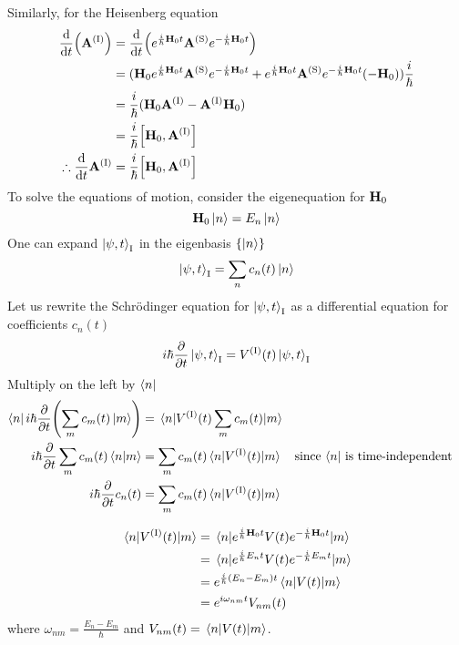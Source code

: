 \documentclass[12pt,a4paper,titlepage]{article}
\newcommand{\trm}[1]{\textrm{#1}} %
\begin{document}
Similarly, for the Heisenberg equation
\begin{equation}
\begin{aligned}
\dv{t}(\vb{A}^{(\trm{I})})&=\dv{t}\qty(e^{\frac{i}{\hbar}\vb{H}_{0}t}\vb{A}^{(\trm{S})}e^{-\frac{i}{\hbar}\vb{H}_{0}t})\\
&=(\vb{H}_{0}e^{\frac{i}{\hbar}\vb{H}_{0}t}\vb{A}^{(\trm{S})}e^{-\frac{i}{\hbar}\vb{H}_{0}t}+e^{\frac{i}{\hbar}\vb{H}_{0}t}\vb{A}^{(\trm{S})}e^{-\frac{i}{\hbar}\vb{H}_{0}t}(-\vb{H}_{0}))\frac{i}{\hbar}\\
&=\frac{i}{\hbar}(\vb{H}_{0}\vb{A}^{(\trm{I})}-\vb{A}^{(\trm{I})}\vb{H}_{0})\\
&=\frac{i}{\hbar}\comm{\vb{H}_{0}}{\vb{A}^{(\trm{I})}}\\
\therefore\dv{t}\vb{A}^{(\trm{I})}&=\frac{i}{\hbar}\comm{\vb{H}_{0}}{\vb{A}^{(\trm{I})}}
\end{aligned}
\end{equation}
To solve the equations of motion, consider the eigenequation for $\vb{H}_{0}$
\begin{equation}
\vb{H}_{0}\ket{n}=E_{n}\ket{n}
\end{equation}
One can expand $\ket{\psi,t}_{\trm{I}}$ in the eigenbasis $\{\ket{n}\}$
\begin{equation}
\ket{\psi,t}_{\trm{I}}=\sum_{n}c_{n}(t)\ket{n}
\end{equation}
Let us rewrite the Schr\"{o}dinger equation for $\ket{\psi,t}_{\trm{I}}$ as a differential equation for coefficients $c_{n}(t)$
\begin{equation}
i\hbar\pdv{t}\ket{\psi,t}_{\trm{I}}=V^{(\trm{I})}(t)\ket{\psi,t}_{\trm{I}}
\end{equation}
Multiply on the left by $\bra{n}$
\begin{equation}
\begin{aligned}
\bra{n}i\hbar\pdv{t}\qty(\sum_{m}c_{m}(t)\ket{m})&=\mel{n}{V^{(\trm{I})}(t)\sum_{m}c_{m}(t)}{m}\\
i\hbar\pdv{t}\sum_{m}c_{m}(t)\ip{n}{m}&=\sum_{m}c_{m}(t)\mel{n}{V^{(\trm{I})}(t)}{m}\qq{since $\bra{n}$ is time-independent}\\
i\hbar\pdv{t}c_{n}(t)&=\sum_{m}c_{m}(t)\mel{n}{V^{(\trm{I})}(t)}{m}
\end{aligned}
\end{equation}

\begin{equation}
\begin{aligned}
\mel{n}{V^{(\trm{I})}(t)}{m}&=\mel{n}{e^{\frac{i}{\hbar}\vb{H}_{0}t}V(t)e^{-\frac{i}{\hbar}\vb{H}_{0}t}}{m}\\
&=\mel{n}{e^{\frac{i}{\hbar}E_{n}t}V(t)e^{-\frac{i}{\hbar}E_{m}t}}{m}\\
&=e^{\frac{i}{\hbar}(E_{n}-E_{m})t}\mel{n}{V(t)}{m}\\
&=e^{i\omega_{nm}t}V_{nm}(t)
\end{aligned}
\end{equation}
where $\omega_{nm}=\frac{E_{n}-E_{m}}{\hbar}$ and $V_{nm}(t)=\mel{n}{V(t)}{m}$.
\end{document}

